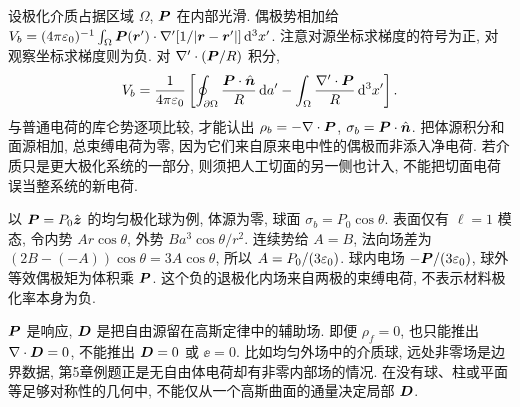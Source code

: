 设极化介质占据区域 $\Omega$, $\boldsymbol{P}$ 在内部光滑. 偶极势相加给
$V_b=(4\pi\varepsilon_0)^{-1}\int_\Omega\boldsymbol{P}(\boldsymbol{r}')\cdot\nabla'[1/|\boldsymbol{r}-\boldsymbol{r}'|]\,\mathrm d^3x'$.
注意对源坐标求梯度的符号为正, 对观察坐标求梯度则为负. 对 $\nabla'\cdot(\boldsymbol{P}/R)$ 积分,
\[
 V_b=\frac1{4\pi\varepsilon_0}\left[
 \oint_{\partial\Omega}\frac{\boldsymbol{P}\cdot\hat{\boldsymbol{n}}}{R}\,\mathrm d a'
 -\int_\Omega\frac{\nabla'\cdot\boldsymbol{P}}{R}\,\mathrm d^3x'\right].
\]
与普通电荷的库仑势逐项比较, 才能认出 $\rho_b=-\nabla\cdot\boldsymbol{P}$, $\sigma_b=\boldsymbol{P}\cdot\hat{\boldsymbol{n}}$. 把体源积分和面源相加, 总束缚电荷为零, 因为它们来自原来电中性的偶极而非添入净电荷. 若介质只是更大极化系统的一部分, 则须把人工切面的另一侧也计入, 不能把切面电荷误当整系统的新电荷.

以 $\boldsymbol{P}=P_0\hat{\boldsymbol{z}}$ 的均匀极化球为例, 体源为零, 球面 $\sigma_b=P_0\cos\theta$. 表面仅有 $\ell=1$ 模态, 令内势 $Ar\cos\theta$, 外势 $Ba^3\cos\theta/r^2$. 连续势给 $A=B$, 法向场差为 $(2B-(-A))\cos\theta=3A\cos\theta$, 所以 $A=P_0/(3\varepsilon_0)$. 球内电场 $-\boldsymbol{P}/(3\varepsilon_0)$, 球外等效偶极矩为体积乘 $\boldsymbol{P}$. 这个负的退极化内场来自两极的束缚电荷, 不表示材料极化率本身为负.

$\boldsymbol{P}$ 是响应, $\boldsymbol{D}$ 是把自由源留在高斯定律中的辅助场. 即便 $\rho_f=0$, 也只能推出 $\nabla\cdot\boldsymbol{D}=0$, 不能推出 $\boldsymbol{D}=0$ 或 $\ee=0$. 比如均匀外场中的介质球, 远处非零场是边界数据, 第5章例题正是无自由体电荷却有非零内部场的情况. 在没有球、柱或平面等足够对称性的几何中, 不能仅从一个高斯曲面的通量决定局部 $\boldsymbol{D}$.
